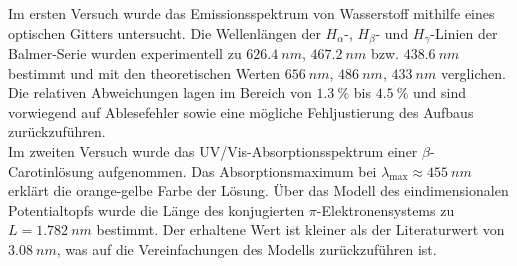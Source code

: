 Im ersten Versuch wurde das Emissionsspektrum von Wasserstoff mithilfe eines optischen Gitters untersucht. Die Wellenlängen der $H_\alpha$-, $H_\beta$- und $H_\gamma$-Linien der Balmer-Serie wurden experimentell zu $\SI{626,4}{nm}$, $\SI{467,2}{nm}$ bzw. $\SI{438,6}{nm}$ bestimmt und mit den theoretischen Werten $\SI{656}{nm}$, $\SI{486}{nm}$, $\SI{433}{nm}$ verglichen. Die relativen Abweichungen lagen im Bereich von $\SI{1,3}{\percent}$ bis $\SI{4,5}{\percent}$ und sind vorwiegend auf Ablesefehler sowie eine mögliche Fehljustierung des Aufbaus zurückzuführen. \\
Im zweiten Versuch wurde das UV/Vis-Absorptionsspektrum einer $\beta$-Carotinlösung aufgenommen. Das Absorptionsmaximum bei $\lambda_{\text{max}} \approx \SI{455}{nm}$ erklärt die orange-gelbe Farbe der Lösung. Über das Modell des eindimensionalen Potentialtopfs wurde die Länge des konjugierten $\pi$-Elektronensystems zu $L = \SI{1,782}{nm}$ bestimmt. Der erhaltene Wert ist kleiner als der Literaturwert von $\SI{3,08}{nm}$, was auf die Vereinfachungen des Modells zurückzuführen ist.